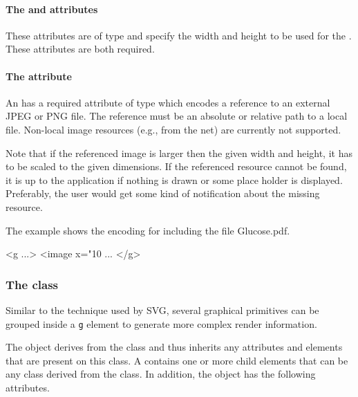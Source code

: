 \paragraph{The \fixttspace{} and  attributes}

These attributes are of type
\RelAbsVector and specify the width and height to be used for the \Image. These attributes are both required.

\paragraph{The \fixttspace{} attribute}

An \Image has a required attribute  of type
 which encodes a reference to an external JPEG or PNG file. The reference must be an absolute or relative path to a local file.
Non-local image resources (e.g., from the net) are currently not supported.


Note that if the referenced image is larger then the given 
width and height, it has to be scaled to the given dimensions.
If the referenced resource cannot be found, it is up to the application if nothing is drawn or some place holder is displayed.
Preferably, the user would get some kind of notification about the missing resource.

The example shows the encoding for including the file Glucose.pdf.
{
\footnotesize
\begin{example}
 <g ...>
  <image x="10%
      ...
</g> 
\end{example}
}


\subsubsection{The  class}
\label{rendergroup-class}

Similar to the technique used by SVG, several graphical primitives can be grouped inside a \texttt{g} 
element to generate more complex render information.



The \RenderGroup object derives from the \GraphicalPrimitiveTwoD class
and thus inherits any attributes and elements that are present on this
class.
A \RenderGroup contains one or more child elements that can be any class derived from the \TransformationTwoD class.
In addition, the \RenderGroup object has the following attributes.

